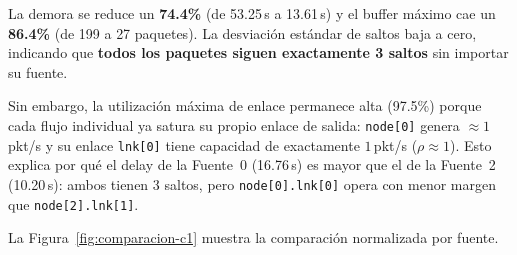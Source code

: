 \documentclass[10pt,letterpaper,twocolumn]{article}
\newcommand{\coltablesetup}{%
  \scriptsize
  \setlength{\tabcolsep}{3pt}%
  \renewcommand{\arraystretch}{1.08}%
}
\begin{document}
\begin{table}[!ht]
  \centering
  \caption{Comparación Caso~1: baseline vs.\ algoritmo propuesto.}
  \label{tab:comparacion-c1}
  \coltablesetup
\end{table}

La demora se reduce un \textbf{74.4\%} (de 53.25\,s a 13.61\,s) y el
buffer máximo cae un \textbf{86.4\%} (de 199 a 27 paquetes). La desviación
estándar de saltos baja a cero, indicando que \textbf{todos los paquetes
siguen exactamente 3 saltos} sin importar su fuente.

Sin embargo, la utilización máxima de enlace permanece alta (97.5\%) porque
cada flujo individual ya satura su propio enlace de salida: \texttt{node[0]}
genera $\approx 1$\,pkt/s y su enlace \texttt{lnk[0]} tiene capacidad de
exactamente $1$\,pkt/s ($\rho \approx 1$). Esto explica por qué el delay
de la Fuente~0 (16.76\,s) es mayor que el de la Fuente~2 (10.20\,s): ambos
tienen 3 saltos, pero \texttt{node[0].lnk[0]} opera con menor margen que
\texttt{node[2].lnk[1]}.

La Figura~\ref{fig:comparacion-c1} muestra la comparación normalizada por
fuente.
\end{document}
